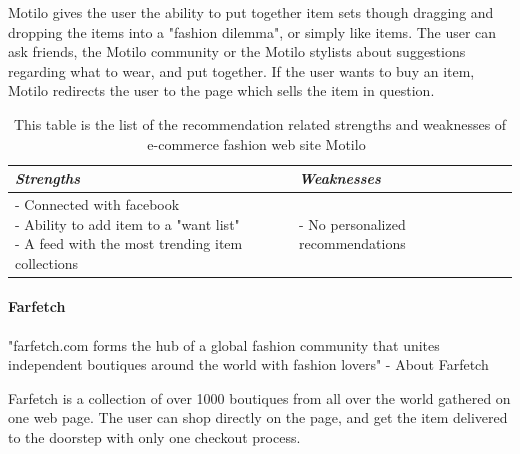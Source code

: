     Motilo gives the user the ability to put together item sets though dragging and dropping the items into a "fashion dilemma", or simply like items.
    The user can ask friends, the Motilo community or the Motilo stylists about suggestions regarding what to wear, and put together.
    If the user wants to buy an item, Motilo redirects the user to the page which sells the item in question.
    \begin{table}[H]
        \centering
        \begin{tabular}{l|l}
            \toprule
            \emph{Strengths} & \emph{Weaknesses} \\ \hline
            \pbox{9cm}{
                - Connected with facebook \\
                - Ability to add item to a "want list" \\
                - A feed with the most trending item collections
            } & \pbox{9cm}{
                - No personalized recommendations \\
            } \\ \bottomrule
        \end{tabular}
        \caption[Recommendation related strengths and weaknesses of Motilo~\cite{motilo}]{This table is the list of the recommendation related strengths and weaknesses of e-commerce fashion web site Motilo~\cite{motilo}}
        \label{table:ecommenreceMotilo}
    \end{table}


\paragraph{Farfetch} %
\label{par:farfetch}
    "farfetch.com forms the hub of a global fashion community that unites independent boutiques around the world with fashion lovers" - About Farfetch~\cite{Farfetch}

    Farfetch is a collection of over 1000 boutiques from all over the world gathered on one web page.
    The user can shop directly on the page, and get the item delivered to the doorstep with only one checkout process.


